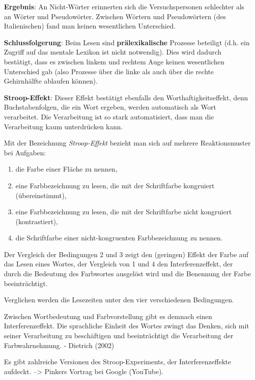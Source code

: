 \documentclass[
  letterpaper,
]{scrbook}
\begin{document}
\textbf{Ergebnis}: An Nicht-Wörter erinnerten sich die Versuchspersonen
schlechter als an Wörter und Pseudowörter. Zwischen Wörtern und
Pseudowörtern (des Italienischen) fand man keinen wesentlichen
Unterschied.

\textbf{Schlussfolgerung}: Beim Lesen sind \textbf{prälexikalische}
Prozesse beteiligt (d.h. ein Zugriff auf das mentale Lexikon ist nicht
notwendig). Dies wird dadurch bestätigt, dass es zwischen linkem und
rechtem Auge keinen wesentlichen Unterschied gab (also Prozesse über die
linke als auch über die rechte Gehirnhälfte ablaufen können).

\textbf{Stroop-Effekt}: Dieser Effekt bestätigt ebenfalls den
Worthaftigkeitseffekt, denn Buchstabenfolgen, die ein Wort ergeben,
werden automatisch als Wort verarbeitet. Die Verarbeitung ist so stark
automatisiert, dass man die Verarbeitung kaum unterdrücken kann.

Mit der Bezeichnung \emph{Stroop-Effekt} bezieht man sich auf mehrere
Reaktionsmuster bei Aufgaben:

\begin{enumerate}
\def\labelenumi{\arabic{enumi}.}
\item
  die Farbe einer Fläche zu nennen,
\item
  eine Farbbezeichnung zu lesen, die mit der Schriftfarbe kongruiert
  (übereinstimmt),
\item
  eine Farbbezeichnung zu lesen, die mit der Schriftfarbe nicht
  kongruiert (kontrastiert),
\item
  die Schriftfarbe einer nicht-kongruenten Farbbezeichnung zu nennen.
\end{enumerate}

Der Vergleich der Bedingungen 2 und 3 zeigt den (geringen) Effekt der
Farbe auf das Lesen eines Wortes, der Vergleich von 1 und 4 den
Interferenzeffekt, der durch die Bedeutung des Farbwortes ausgelöst wird
und die Benennung der Farbe beeinträchtigt.

Verglichen werden die Lesezeiten unter den vier verschiedenen
Bedingungen.

Zwischen Wortbedeutung und Farbvorstellung gibt es demnach einen
Interferenzeffekt. Die sprachliche Einheit des Wortes zwingt das Denken,
sich mit seiner Verarbeitung zu beschäftigen und beeinträchtigt die
Verarbeitung der Farbwahrnehmung. - Dietrich (2002)

Es gibt zahlreiche Versionen des Stroop-Experiments, der
Interferenzeffekte aufdeckt. --\textgreater{} Pinkers Vortrag bei Google
(YouTube).
\end{document}
